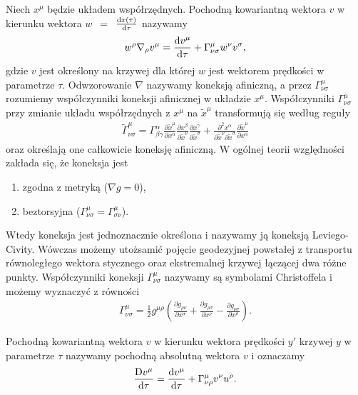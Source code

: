 \begin{definition}
Niech $x^\mu$ będzie układem współrzędnych. 
Pochodną kowariantną wektora $v$ w kierunku wektora 
$w$~$=$~$\frac{\text{d} x(\tau)}{\text{d} \tau}$ nazywamy
\begin{align*}
w^\rho \nabla_\rho v^\mu = \frac{\text{d} v^\mu}{\text{d} \tau}
+ \Gamma^\mu_{\nu\sigma} w^\nu v^\sigma ,
\end{align*}
gdzie $v$ jest określony na krzywej dla której $w$ 
jest wektorem prędkości w parametrze $\tau$. Odwzorowanie 
$\nabla$ nazywamy koneksją afiniczną, a 
przez $\Gamma^\mu_{\nu\sigma} $
rozumiemy współczynniki koneksji afinicznej w układzie $x^\mu$. 
Współczynniki $\Gamma^\mu_{\nu\sigma}$ przy zmianie układu współrzędnych z $x^\mu$
na $\tilde{x}^\mu$
transformują się według reguły
\begin{align*}
\tilde{\Gamma}^\mu_{\nu\sigma} = \Gamma^\alpha_{\beta\gamma}
\frac{\partial \tilde{x}^\mu}{\partial x^\alpha }
\frac{\partial x^\beta}{\partial \tilde{x}^\nu }
\frac{\partial x^\gamma}{\partial \tilde{x}^\sigma }
+
\frac{\partial^2 x^\alpha}{\partial \tilde{x}^\nu \partial \tilde{x}^\sigma }
\frac{\partial \tilde{x}^\mu}{\partial x^\alpha }
\end{align*} 
oraz określają one całkowicie koneksję afiniczną.
W ogólnej teorii względności 
zakłada się, że koneksja jest
\begin{enumerate}
    \item zgodna z metryką ($\nabla g =0$),
    \item beztorsyjna ($\Gamma^\mu_{\nu\sigma} 
        = \Gamma^\mu_{\sigma\nu}$).
\end{enumerate} 
Wtedy koneksja jest jednoznacznie określona i nazywamy ją
 koneksją Leviego-Civity. Wówczas możemy utożsamić pojęcie 
 geodezyjnej powstałej z transportu równoległego wektora stycznego 
 oraz ekstremalnej krzywej łączącej dwa różne punkty.
 Współczynniki koneksji 
$\Gamma^\mu_{\nu\sigma}$ nazywamy są symbolami Christoffela
i możemy wyznaczyć z równości
\begin{align*}
\Gamma^\mu_{\nu\sigma} = \frac{1}{2} g^{\mu\rho} 
\left(\frac{\partial g_{\rho\nu}}{\partial x^\sigma}+ 
\frac{\partial g_{\rho\sigma}}{\partial x^\nu}-
\frac{\partial g_{\nu\sigma}}{\partial x^\rho}\right).
\end{align*}
\end{definition}
\begin{definition}
Pochodną kowariantną wektora $v$ w kierunku wektora prędkości
$y'$ krzywej $y$ w parametrze $\tau$ nazywamy
pochodną absolutną wektora $v$ i oznaczamy 
\begin{align*}
\frac{\text{D} v^\mu }{\text{d} \tau } = \frac{\text{d} v^\mu}{\text{d} \tau}
+ \Gamma^\mu_{\nu\rho} v^\nu u^\rho.
\end{align*}
\end{definition}\noindent
